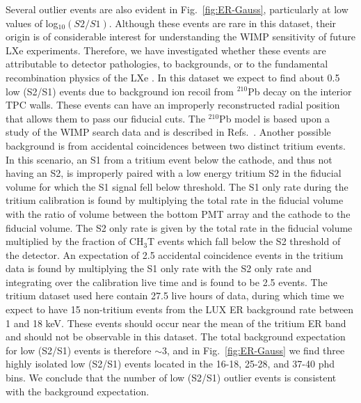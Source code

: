 Several outlier events are also evident in Fig.~\ref{fig:ER-Gauss}, particularly at low values of log$_{10}(S2/S1)$. Although these events are rare in this dataset, their origin is of considerable interest for understanding the WIMP sensitivity of future LXe experiments.  Therefore, we have investigated whether these events are attributable to detector pathologies, to backgrounds, or to the fundamental recombination physics of the LXe . In this dataset we expect to find about 0.5 low (S2/S1) events due to background ion recoil from $^{210}$Pb decay on the interior TPC walls. These events can have an improperly reconstructed radial position that allows them to pass our fiducial cuts.  
The $^{210}$Pb model is based upon a study of the WIMP search data and is described in Refs.~\cite{lux-reanalysis,Chang_Thesis}. Another possible background is from accidental coincidences between two distinct tritium events. In this scenario, an S1 from a tritium event below the cathode, and thus not having an S2, is improperly paired with a low energy tritium S2 in the fiducial volume for which the S1 signal fell below threshold. The S1 only rate during the tritium calibration is found by multiplying the total rate in the fiducial volume with the ratio of volume between the bottom PMT array and the cathode to the fiducial volume.  The S2 only rate is given by the total rate in the fiducial volume multiplied by the fraction of CH$_3$T events which fall below the S2 threshold of the detector.  An expectation of 2.5 accidental coincidence events in the tritium data is found by  multiplying the S1 only rate with the S2 only rate and integrating over the calibration live time and is found to be 2.5 events.  The tritium dataset used here contain 27.5 live hours of data, during which time we expect to have 15 non-tritium events from the LUX ER background rate between 1 and 18 keV. These events should occur near the mean of the tritium ER band and should not be observable in this dataset. The total background expectation for low (S2/S1) events is therefore $\sim$3, and in Fig.~\ref{fig:ER-Gauss} we find three highly isolated low (S2/S1) events located in the 16-18, 25-28, and 37-40 phd bins. We conclude that the number of low (S2/S1) outlier events is consistent with the background expectation.
